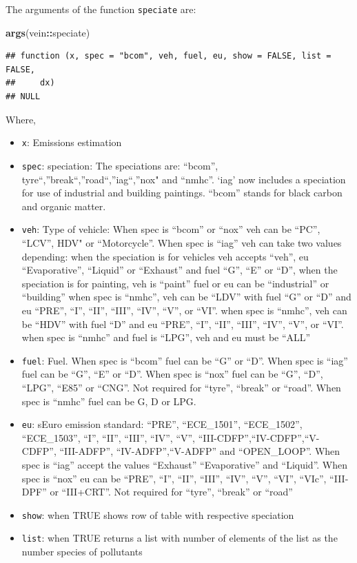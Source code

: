 \documentclass[12pt,graybox,envcountchap,sectrefs]{krantz}
\makeatletter
\newenvironment{Shaded}{\begin{snugshade}}{\end{snugshade}}
\newcommand{\KeywordTok}[1]{\textcolor[rgb]{0.13,0.29,0.53}{\textbf{#1}}}
\newcommand{\OperatorTok}[1]{\textcolor[rgb]{0.81,0.36,0.00}{\textbf{#1}}}
\newcommand{\NormalTok}[1]{#1}
\providecommand{\tightlist}{%
  \setlength{\itemsep}{0pt}\setlength{\parskip}{0pt}}
\newenvironment{kframe}{%
\medskip{}
\setlength{\fboxsep}{.8em}
 \def\at@end@of@kframe{}%
 \ifinner\ifhmode%
  \def\at@end@of@kframe{\end{minipage}}%
  \begin{minipage}{\columnwidth}%
 \fi\fi%
 \def\FrameCommand##1{\hskip\@totalleftmargin \hskip-\fboxsep
 \colorbox{shadecolor}{##1}\hskip-\fboxsep
     \hskip-\linewidth \hskip-\@totalleftmargin \hskip\columnwidth}%
 \MakeFramed {\advance\hsize-\width
   \@totalleftmargin\z@ \linewidth\hsize
   \@setminipage}}%
 {\par\unskip\endMakeFramed%
 \at@end@of@kframe}
\renewenvironment{Shaded}{\begin{kframe}}{\end{kframe}}
\theoremstyle{definition}
\theoremstyle{definition}
\theoremstyle{definition}
\theoremstyle{remark}
\makeatother
\begin{document}
The arguments of the function \texttt{speciate} are:

\begin{Shaded}
\begin{Highlighting}[]
\KeywordTok{args}\NormalTok{(vein}\OperatorTok{::}\NormalTok{speciate)}
\end{Highlighting}
\end{Shaded}

\begin{verbatim}
## function (x, spec = "bcom", veh, fuel, eu, show = FALSE, list = FALSE, 
##     dx) 
## NULL
\end{verbatim}

Where,

\begin{itemize}
\tightlist
\item
  \texttt{x}: Emissions estimation
\item
  \texttt{spec}: speciation: The speciations are: ``bcom'',
  tyre``,''break``,''road``,''iag``,''nox" and ``nmhc''. `iag' now
  includes a speciation for use of industrial and building paintings.
  ``bcom'' stands for black carbon and organic matter.
\item
  \texttt{veh}: Type of vehicle: When spec is ``bcom'' or ``nox'' veh
  can be ``PC'', ``LCV'', HDV" or ``Motorcycle''. When spec is ``iag''
  veh can take two values depending: when the speciation is for vehicles
  veh accepts ``veh'', eu ``Evaporative'', ``Liquid'' or ``Exhaust'' and
  fuel ``G'', ``E'' or ``D'', when the speciation is for painting, veh
  is ``paint'' fuel or eu can be ``industrial'' or ``building'' when
  spec is ``nmhc'', veh can be ``LDV'' with fuel ``G'' or ``D'' and eu
  ``PRE'', ``I'', ``II'', ``III'', ``IV'', ``V'', or ``VI''. when spec
  is ``nmhc'', veh can be ``HDV'' with fuel ``D'' and eu ``PRE'', ``I'',
  ``II'', ``III'', ``IV'', ``V'', or ``VI''. when spec is ``nmhc'' and
  fuel is ``LPG'', veh and eu must be ``ALL''
\item
  \texttt{fuel}: Fuel. When spec is ``bcom'' fuel can be ``G'' or ``D''.
  When spec is ``iag'' fuel can be ``G'', ``E'' or ``D''. When spec is
  ``nox'' fuel can be ``G'', ``D'', ``LPG'', ``E85'' or ``CNG''. Not
  required for ``tyre'', ``break'' or ``road''. When spec is ``nmhc''
  fuel can be G, D or LPG.
\item
  \texttt{eu}: sEuro emission standard: ``PRE'', ``ECE\_1501'',
  ``ECE\_1502'', ``ECE\_1503'', ``I'', ``II'', ``III'', ``IV'', ``V'',
  ``III-CDFP'',``IV-CDFP'',``V-CDFP'', ``III-ADFP'',
  ``IV-ADFP'',``V-ADFP'' and ``OPEN\_LOOP''. When spec is ``iag'' accept
  the values ``Exhaust'' ``Evaporative'' and ``Liquid''. When spec is
  ``nox'' eu can be ``PRE'', ``I'', ``II'', ``III'', ``IV'', ``V'',
  ``VI'', ``VIc'', ``III-DPF'' or ``III+CRT''. Not required for
  ``tyre'', ``break'' or ``road''
\item
  \texttt{show}: when TRUE shows row of table with respective speciation
\item
  \texttt{list}: when TRUE returns a list with number of elements of the
  list as the number species of pollutants
\end{itemize}
\end{document}
